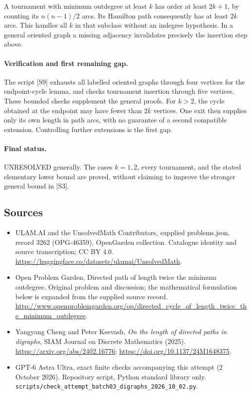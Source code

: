 \documentclass[11pt,a4paper]{article}
\begin{document}
A tournament with minimum outdegree at least $k$ has order at least
$2k+1$, by counting its $n(n-1)/2$ arcs. Its Hamilton path consequently
has at least $2k$ arcs. This handles all $k$ in that subclass without
an indegree hypothesis. In a general oriented graph a missing
adjacency invalidates precisely the insertion step above.

\paragraph{Verification and first remaining gap.}
The script [S9] exhausts all labelled oriented graphs through
four vertices for the endpoint-cycle lemma, and checks tournament
insertion through five vertices. These bounded checks supplement
the general proofs. For $k>2$, the cycle obtained at the endpoint
may have fewer than $2k$ vertices. One exit then supplies only its
own length in path arcs, with no guarantee of a second compatible
extension. Controlling further extensions is the first gap.

\paragraph{Final status.}
UNRESOLVED generally. The cases $k=1,2$, every tournament, and the
stated elementary lower bound are proved, without claiming to
improve the stronger general bound in [S3].
\subsection{Sources}
\begin{itemize}
\item[S1] ULAM.AI and the UnsolvedMath Contributors, supplied problems.json, record 3262 (OPG-46359), OpenGarden collection. Catalogue identity and source transcription; CC BY 4.0.
\url{https://huggingface.co/datasets/ulamai/UnsolvedMath}.
\item[S2] Open Problem Garden, Directed path of length twice the minimum outdegree. Original problem and discussion; the mathematical formulation below is expanded from the supplied source record.
\url{http://www.openproblemgarden.org/op/directed_cycle_of_length_twice_the_minimum_outdegree}.
\item[S3] Yangyang Cheng and Peter Keevash, \emph{On the length of directed paths in digraphs}, SIAM Journal on Discrete Mathematics (2025). \url{https://arxiv.org/abs/2402.16776}; \url{https://doi.org/10.1137/24M1648375}.
\item[S9] GPT-6 Astra Ultra, exact finite checks accompanying this attempt (2 October 2026). Repository script, Python standard library only. \texttt{scripts/check\_attempt\_batch03\_digraphs\_2026\_10\_02.py}.
\end{itemize}
\end{document}
